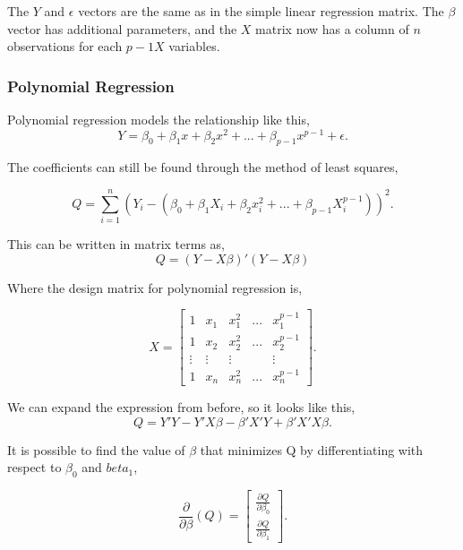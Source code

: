 \noindent The $Y$ and $\epsilon$ vectors are the same as in the simple linear regression matrix. The $\beta$ vector has additional parameters, and the $X$ matrix now has a column of $n$ observations for each $p-1 X$ variables. 

\subsubsection{Polynomial Regression}
Polynomial regression models the relationship like this, 
\begin{equation}
	Y=\beta_0 + \beta_1 x + \beta_2 x^2	+ ... + \beta_{p-1} x^{p-1}+ \epsilon .
	\end{equation}

\noindent The coefficients can still be found through the method of least squares,

\begin{equation}
	Q=\sum_{i=1}^{n}(Y_i -(\beta_0 + \beta_1 X_i + \beta_2 x_i^2 + ... + \beta_{p-1}X_{i}^{p-1}))^2 .
\end{equation}
\newline

\noindent This can be written in matrix terms as,
\begin{equation}
	Q=(Y-X\beta)' (Y-X\beta) 
\end{equation}

\noindent Where the design matrix for polynomial regression is, 

\begin{equation}
	 X=
\left[
\begin{array}{ccccc}
	1&x_1&x_1^2&...&x_1^{p-1}\\ 
	1&x_2&x_2^2&...&x_2^{p-1} \\
	\vdots & \vdots &\vdots &&\vdots\\
	1&x_n&x_n^2&...&x_n^{p-1} 
\end{array}
\right].
\end{equation}

\noindent We can expand the expression from before, so it looks like this,
\begin{equation}
	Q=Y' Y -Y' X \beta -\beta' X' Y + \beta' X' X \beta .
\end{equation}


\noindent It is possible to find the value of $\beta$ that minimizes Q by differentiating with respect to $\beta_0$ and $beta_1$,

\begin{equation}
\frac{\partial}{\partial \beta}(Q)=
\left[
\begin{array}{c}
	\frac{\partial Q}{\partial \beta_0}\\ 
	\frac{\partial Q}{\partial \beta_1}
\end{array}
\right].
\end{equation}

